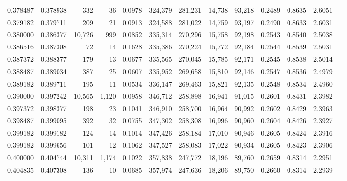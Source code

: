 \begin{tabular}{rrrrrrrrrrrrr}
0.378487 & 0.378938 &    332 &    36 &                                     0.0978 & 324,379 & 281,231 &  14,738 &  93,218 & 0.2489 & 0.8635 & 2.6051 \\
0.379182 & 0.379711 &    209 &    21 &                                     0.0913 & 324,588 & 281,022 &  14,759 &  93,197 & 0.2490 & 0.8633 & 2.6031 \\
0.380000 & 0.386377 & 10,726 &   999 &                                     0.0852 & 335,314 & 270,296 &  15,758 &  92,198 & 0.2543 & 0.8540 & 2.5038 \\
0.386516 & 0.387308 &     72 &    14 &                                     0.1628 & 335,386 & 270,224 &  15,772 &  92,184 & 0.2544 & 0.8539 & 2.5031 \\
0.387372 & 0.388377 &    179 &    13 &                                     0.0677 & 335,565 & 270,045 &  15,785 &  92,171 & 0.2545 & 0.8538 & 2.5014 \\
0.388487 & 0.389034 &    387 &    25 &                                     0.0607 & 335,952 & 269,658 &  15,810 &  92,146 & 0.2547 & 0.8536 & 2.4979 \\
0.389182 & 0.389711 &    195 &    11 &                                     0.0534 & 336,147 & 269,463 &  15,821 &  92,135 & 0.2548 & 0.8534 & 2.4960 \\
0.390000 & 0.397242 & 10,565 & 1,120 &                                     0.0958 & 346,712 & 258,898 &  16,941 &  91,015 & 0.2601 & 0.8431 & 2.3982 \\
0.397372 & 0.398377 &    198 &    23 &                                     0.1041 & 346,910 & 258,700 &  16,964 &  90,992 & 0.2602 & 0.8429 & 2.3963 \\
0.398487 & 0.399095 &    392 &    32 &                                     0.0755 & 347,302 & 258,308 &  16,996 &  90,960 & 0.2604 & 0.8426 & 2.3927 \\
0.399182 & 0.399182 &    124 &    14 &                                     0.1014 & 347,426 & 258,184 &  17,010 &  90,946 & 0.2605 & 0.8424 & 2.3916 \\
0.399182 & 0.399656 &    101 &    12 &                                     0.1062 & 347,527 & 258,083 &  17,022 &  90,934 & 0.2605 & 0.8423 & 2.3906 \\
0.400000 & 0.404744 & 10,311 & 1,174 &                                     0.1022 & 357,838 & 247,772 &  18,196 &  89,760 & 0.2659 & 0.8314 & 2.2951 \\
0.404835 & 0.407308 &    136 &    10 &                                     0.0685 & 357,974 & 247,636 &  18,206 &  89,750 & 0.2660 & 0.8314 & 2.2939 \\

\end{tabular}
